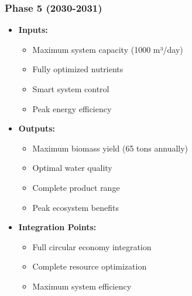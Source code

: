 \subsubsection{Phase 5 (2030-2031)}
\begin{itemize}
    \item \textbf{Inputs:}
    \begin{itemize}
        \item Maximum system capacity (1000 m³/day)
        \item Fully optimized nutrients
        \item Smart system control
        \item Peak energy efficiency
    \end{itemize}
    \item \textbf{Outputs:}
    \begin{itemize}
        \item Maximum biomass yield (65 tons annually)
        \item Optimal water quality
        \item Complete product range
        \item Peak ecosystem benefits
    \end{itemize}
    \item \textbf{Integration Points:}
    \begin{itemize}
        \item Full circular economy integration
        \item Complete resource optimization
        \item Maximum system efficiency
    \end{itemize}
\end{itemize}


